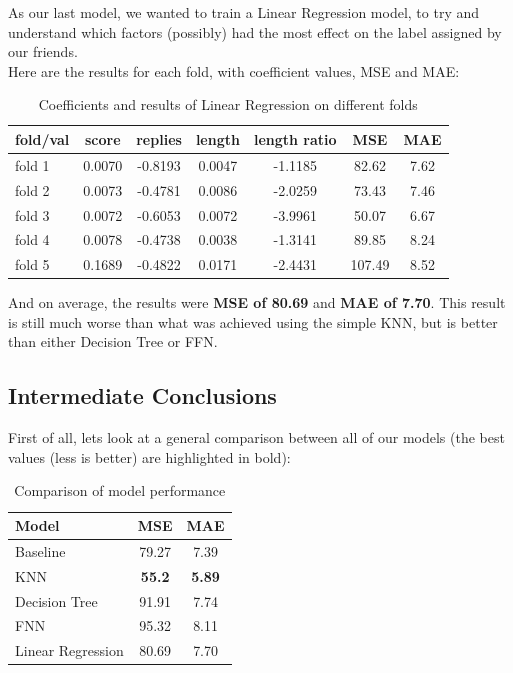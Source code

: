 \documentclass[11pt, oneside]{article}   	%
\begin{document}
As our last model, we wanted to train a Linear Regression model, to try and understand which factors (possibly) had the most effect on the label assigned by our friends.\\
Here are the results for each fold, with coefficient values, MSE and MAE:
\begin{table}[H]
\begin{center}
    \begin{tabular}{|l|c|c|c|c|c|c|}
    \hline
    fold/val & score & replies & length & length ratio & MSE & MAE \\
    \hline
    fold 1 & 0.0070 & -0.8193 & 0.0047 & -1.1185 & 82.62 & 7.62 \\
    fold 2 & 0.0073 & -0.4781 & 0.0086 & -2.0259 & 73.43 & 7.46 \\
    fold 3 & 0.0072 & -0.6053 & 0.0072 & -3.9961 & 50.07 & 6.67 \\
    fold 4 & 0.0078 & -0.4738 & 0.0038 & -1.3141 & 89.85 & 8.24 \\
    fold 5 & 0.1689 & -0.4822 & 0.0171 & -2.4431 & 107.49 & 8.52\\
    \hline
  \end{tabular}
  \caption{Coefficients and results of Linear Regression on different folds}
\end{center}
\end{table}
And on average, the results were \textbf{MSE of 80.69} and \textbf{MAE of 7.70}. This result is still much worse than what was achieved using the simple KNN, but is better than either Decision Tree or FFN.

\subsection{Intermediate Conclusions}\label{sec:inter_conclusions}
First of all, lets look at a general comparison between all of our models (the best values (less is better) are highlighted in bold):
\begin{table}[H]
  \begin{center}
  \begin{tabular}{|l|c|c|}
    \hline
    Model & MSE & MAE \\
    \hline
    Baseline & 79.27 & 7.39 \\
    KNN & \textbf{55.2} & \textbf{5.89} \\
    Decision Tree & 91.91 & 7.74 \\
    FNN & 95.32 & 8.11 \\
    Linear Regression & 80.69 & 7.70 \\
    \hline
  \end{tabular}
  \caption{Comparison of model performance}
  \end{center}
\end{table}
\end{document}
